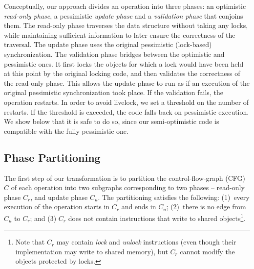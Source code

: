 Conceptually, our approach divides an operation into three phases: an optimistic \emph{read-only phase},
a pessimistic \emph{update phase} and a \emph{validation phase} that conjoins them.
The read-only phase traverses the data structure without taking any locks, while maintaining sufficient information to later ensure the correctness of the traversal.
The update phase uses the original pessimistic (lock-based) synchronization.
The validation phase bridges between the optimistic and pessimistic ones.
It first locks the objects for which a lock would have been held at this point by
the original locking code, and then validates the correctness
of the read-only phase. This allows the
update phase to run as if an execution of the original pessimistic synchronization
took place. If the validation fails, the operation
restarts. In order to avoid livelock, we set a threshold on the number of restarts.
If the threshold is exceeded, the code falls back on pessimistic execution.
We show below that
it is safe to do so, since our semi-optimistic code is compatible
with the fully pessimistic one.


\subsection{Phase Partitioning}\label{ssec:extendedTran}

The first step of our transformation is to partition the
control-flow-graph (CFG) $C$ of each operation
into two subgraphs corresponding to two phases --
read-only phase $C_r$, and update phase $C_u$. The partitioning satisfies the following:
(1)~every execution of the operation starts in $C_r$ and ends in $C_u$; (2)~there is no edge from $C_u$ to  $C_r$;
and (3) $C_r$ does not contain instructions that write to shared objects\footnote{
Note that $C_r$ may contain \emph{lock} and \emph{unlock} instructions (even though their implementation may write to shared memory), but $C_r$ cannot modify the objects protected by locks.}.

